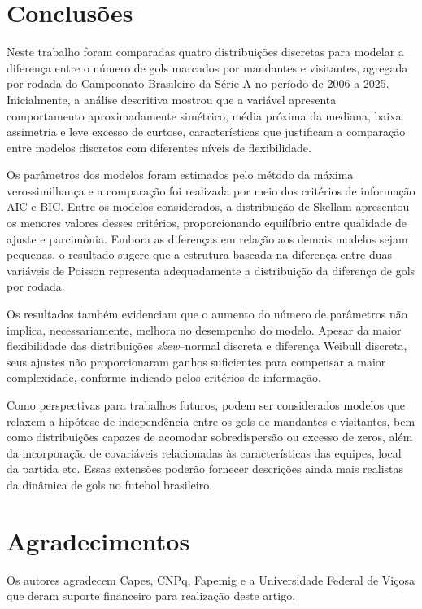 \documentclass[12pt,a4paper]{article}\usepackage[]{graphicx}\usepackage[]{xcolor}
\begin{document}
\section{Conclusões}

Neste trabalho foram comparadas quatro distribuições discretas para modelar a diferença entre o número de gols marcados por mandantes e visitantes, agregada por rodada do Campeonato Brasileiro da Série A no período de 2006 a 2025. Inicialmente, a análise descritiva mostrou que a variável apresenta comportamento aproximadamente simétrico, média próxima da mediana, baixa assimetria e leve excesso de curtose, características que justificam a comparação entre modelos discretos com diferentes níveis de flexibilidade.

Os parâmetros dos modelos foram estimados pelo método da máxima verossimilhança e a comparação foi realizada por meio dos critérios de informação AIC e BIC. Entre os modelos considerados, a distribuição de Skellam apresentou os menores valores desses critérios, proporcionando equilíbrio entre qualidade de ajuste e parcimônia. Embora as diferenças em relação aos demais modelos sejam pequenas, o resultado sugere que a estrutura baseada na diferença entre duas variáveis de Poisson representa adequadamente a distribuição da diferença de gols por rodada.

Os resultados também evidenciam que o aumento do número de parâmetros não implica, necessariamente, melhora no desempenho do modelo. Apesar da maior flexibilidade das distribuições \textit{skew}--normal discreta e diferença Weibull discreta, seus ajustes não proporcionaram ganhos suficientes para compensar a maior complexidade, conforme indicado pelos critérios de informação.

Como perspectivas para trabalhos futuros, podem ser considerados modelos que relaxem a hipótese de independência entre os gols de mandantes e visitantes, bem como distribuições capazes de acomodar sobredispersão ou excesso de zeros, além da incorporação de covariáveis relacionadas às características das equipes, local da partida etc. Essas extensões poderão fornecer descrições ainda mais realistas da dinâmica de gols no futebol brasileiro.

\section*{Agradecimentos}
Os autores agradecem Capes, CNPq, Fapemig e a Universidade Federal de Viçosa que deram suporte financeiro para realização deste artigo.
\begin{flushleft}



\end{flushleft}
\end{document}
